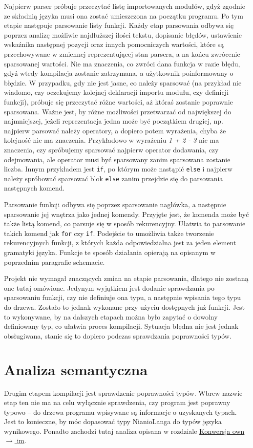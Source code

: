 \documentclass[licencjacka]{pracamgr}
\begin{document}
Najpierw parser próbuje przeczytać listę importowanych modułów, gdyż zgodnie ze składnią języka musi ona zostać umieszczona na początku programu. Po tym etapie następuje parsowanie listy funkcji. Każdy etap parsowania odbywa się poprzez analizę możliwie najdłuższej ilości tekstu, dopisanie błędów, ustawienie wskaźnika następnej pozycji oraz innych pomocniczych wartości, które są przechowywane w zmiennej reprezentującej stan parsera, a na końcu zwrócenie sparsowanej wartości. Nie ma znaczenia, co zwróci dana funkcja w razie błędu, gdyż wtedy kompilacja zostanie zatrzymana, a użytkownik poinformowany o błędzie. W przypadku, gdy nie jest jasne, co należy sparsować (na przykład nie wiadomo, czy oczekujemy kolejnej deklaracji importu modułu, czy definicji funkcji), próbuje się przeczytać różne wartości, aż któraś zostanie poprawnie sparsowana. Ważne jest, by różne możliwości przetwarzać od największej do najmniejszej, jeżeli reprezentacja jedna może być początkiem drugiej, np. najpierw parsować należy operatory, a dopiero potem wyrażenia, chyba że kolejność nie ma znaczenia. Przykładowo w wyrażeniu \emph{1 + 2 - 3} nie ma znaczenia, czy spróbujemy sparsować najpierw operator dodawania, czy odejmowania, ale operator musi być sparsowany zanim sparsowana zostanie liczba. Innym przykładem jest \texttt{if}, po którym może nastąpić \texttt{else} i najpierw należy spróbować sparsować blok \texttt{else} zanim przejdzie się do parsowania następnych komend.

Parsowanie funkcji odbywa się poprzez sparsowanie nagłówka, a następnie sparsowanie jej wnętrza jako jednej komendy. Przyjęte jest, że komenda może być także listą komend, co parsuje się w sposób rekurencyjny. Ułatwia to parsowanie takich komend jak \texttt{for} czy \texttt{if}. Podejście to umożliwia także tworzenie rekurencyjnych funkcji, z których każda odpowiedzialna jest za jeden element gramatyki języka. Funkcje te sposób działania opierają na opisanym w poprzednim paragrafie schemacie.

Projekt nie wymagał znaczących zmian na etapie parsowania, dlatego nie zostaną one tutaj omówione. Jedynym wyjątkiem jest dodanie sprawdzania po sparsowaniu funkcji, czy nie definiuje ona typu, a następnie wpisania tego typu do drzewa. Zostało to jednak wykonane przy użyciu dostępnych już funkcji. Jest to wykonywane, by na dalszych etapach można było zapytać o dowolny definiowany typ, co ułatwia proces kompilacji. Sytuacja błędna nie jest jednak obsługiwana, stanie się to dopiero podczas sprawdzania poprawności typów.
\section{Analiza semantyczna}
Drugim etapem kompilacji jest sprawdzenie poprawności typów. Wbrew nazwie etap ten nie ma na celu wyłącznie sprawdzenia, czy program jest poprawny typowo -- do drzewa programu wpisywane są informacje o uzyskanych typach. Jest to konieczne, by móc dopasować typy NianioLanga do typów języka wynikowego. Ponadto zachodzi tutaj analiza opisana w rozdziale \hyperref[sec:own_to_im]{Konwersja own $\rightarrow$ im}.
\end{document}
